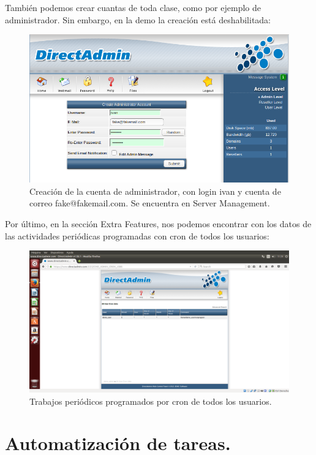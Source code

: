 \begin{itemize}
		También podemos crear cuantas de toda clase, como por ejemplo de administrador. Sin embargo, en la demo la creación está deshabilitada:\\
		
		\begin{figure}[H]
			\centering
			\includegraphics[width=0.7\linewidth]{DirectAdminCrearCuentaAdministrador}
			\caption[Cuenta Administrador]{Creación de la cuenta de administrador, con login ivan y cuenta de correo fake@fakemail.com. Se encuentra en Server Management.}
			\label{fig:DirectAdminCrearCuentaAdministrador}
		\end{figure}
		
		Por último, en la sección Extra Features, nos podemos encontrar con los datos de las actividades periódicas programadas con cron de todos los usuarios:\\
		
		\begin{figure}[H]
			\centering
			\includegraphics[width=0.7\linewidth]{DirectAdminCronJobs}
			\caption[CronJobs]{Trabajos periódicos programados por cron de todos los usuarios.}
			\label{fig:DirectAdminCronJobs}
		\end{figure}

	\end{itemize}
	
\section{Automatización de tareas.}


